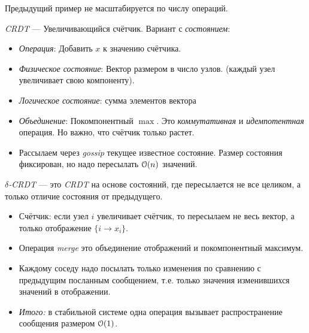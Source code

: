 \begin{remark}
    Предыдущий пример не масштабируется по числу операций.
\end{remark}

\begin{example}
    \textit{CRDT} --- Увеличивающийся счётчик.
    Вариант с \textit{состоянием}:

    \begin{itemize}
        \item \textit{Операция}: Добавить $x$ к значению счётчика.
        \item \textit{Физическое состояние}: Вектор размером в число узлов.
            (каждый узел увеличивает свою компоненту).
        \item \textit{Логическое состояние}: сумма элементов вектора
        \item \textit{Объединение}: Покомпонентный $\max$.
            Это \textit{коммутативная} и \textit{идемпотентная} операция.
            Но важно, что счётчик только растет.
        \item Рассылаем через \textit{gossip} текущее известное состояние.
            Размер состояния фиксирован, но надо пересылать $\mathcal{O}(n)$ значений.
    \end{itemize}
\end{example}

\begin{definition}
    $\delta$\textit{-CRDT} --- это \textit{CRDT} на основе состояний, где пересылается не
    все целиком, а только отличие состояния от предыдущего.
\end{definition}

\begin{example}
    \enewline
    \begin{itemize}
        \item Счётчик: если узел $i$ увеличивает счётчик, то пересылаем не весь вектор,
            а только отображение $\{i \to x_i\}$.
        \item Операция \textit{merge} это объединение отображений и покомпонентный максимум.
        \item Каждому соседу надо посылать только изменения по сравнению с предыдущим посланным
            сообщением, т.е. только значения изменившихся значений в отображении.
        \item \textit{Итого:} в стабильной системе одна операция вызывает распространение
            сообщения размером $\mathcal{O}(1)$.
    \end{itemize}
\end{example}

